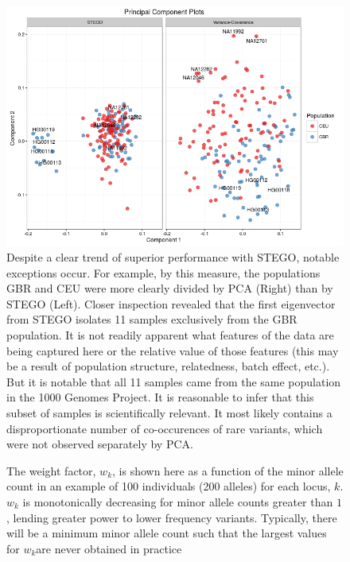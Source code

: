 \begin{figure}
\includegraphics[width=1\columnwidth]{./figures/PCA_CEU_GBR}\caption[Similarity coefficients for populations GBR
and CEU]{Despite a clear trend of superior performance with STEGO, notable
exceptions occur. For example, by this measure, the populations GBR
and CEU were more clearly divided by PCA (Right) than by STEGO (Left).
Closer inspection revealed that the first eigenvector from STEGO isolates
11 samples exclusively from the GBR population. It is not readily
apparent what features of the data are being captured here or the
relative value of those features (this may be a result of population
structure, relatedness, batch effect, etc.). But it is notable that
all 11 samples came from the same population in the 1000 Genomes Project.
It is reasonable to infer that this subset of samples is scientifically
relevant. It most likely contains a disproportionate number of co-occurences
of rare variants, which were not observed separately by PCA.}
\label{fig:CEU_GBR_comparison}
\end{figure}

\begin{figure}
 \caption[Distribution of weight factor]{The weight factor, $w_{k}$, is shown here as a function of the minor
allele count in an example of 100 individuals (200 alleles) for each
locus, $k$. $w_{k}$ is monotonically decreasing for minor allele
counts greater than $1$, lending greater power to lower frequency
variants.  Typically, there will be a minimum minor allele count such
that the largest values for $w_{k}$are never obtained in practice}
\end{figure}

